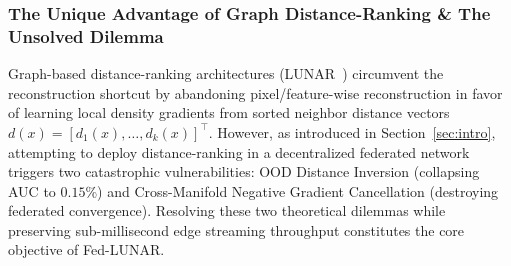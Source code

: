 \subsubsection{The Unique Advantage of Graph Distance-Ranking \& The Unsolved Dilemma}
Graph-based distance-ranking architectures (LUNAR~\cite{goodge2022lunar}) circumvent the reconstruction shortcut by abandoning pixel/feature-wise reconstruction in favor of learning local density gradients from sorted neighbor distance vectors $d(x) = [d_1(x), \dots, d_k(x)]^\top$. However, as introduced in Section~\ref{sec:intro}, attempting to deploy distance-ranking in a decentralized federated network triggers two catastrophic vulnerabilities: OOD Distance Inversion (collapsing AUC to $0.15\%$) and Cross-Manifold Negative Gradient Cancellation (destroying federated convergence). Resolving these two theoretical dilemmas while preserving sub-millisecond edge streaming throughput constitutes the core objective of Fed-LUNAR.
